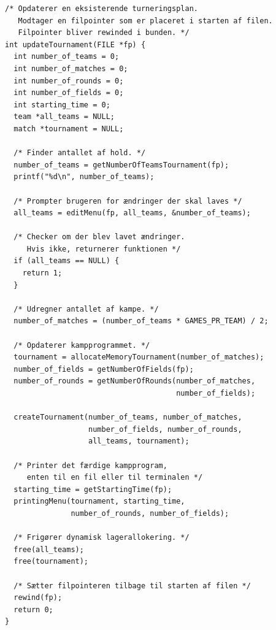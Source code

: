 \begin{listing}[H]
\begin{verbatim}
/* Opdaterer en eksisterende turneringsplan. 
   Modtager en filpointer som er placeret i starten af filen. 
   Filpointer bliver rewinded i bunden. */
int updateTournament(FILE *fp) {
  int number_of_teams = 0;
  int number_of_matches = 0;
  int number_of_rounds = 0;
  int number_of_fields = 0;
  int starting_time = 0;
  team *all_teams = NULL;
  match *tournament = NULL;

  /* Finder antallet af hold. */
  number_of_teams = getNumberOfTeamsTournament(fp);
  printf("%d\n", number_of_teams);

  /* Prompter brugeren for ændringer der skal laves */
  all_teams = editMenu(fp, all_teams, &number_of_teams);

  /* Checker om der blev lavet ændringer. 
     Hvis ikke, returnerer funktionen */
  if (all_teams == NULL) {
    return 1;
  }

  /* Udregner antallet af kampe. */
  number_of_matches = (number_of_teams * GAMES_PR_TEAM) / 2;

  /* Opdaterer kampprogrammet. */
  tournament = allocateMemoryTournament(number_of_matches);
  number_of_fields = getNumberOfFields(fp);
  number_of_rounds = getNumberOfRounds(number_of_matches, 
                                       number_of_fields);
                                       
  createTournament(number_of_teams, number_of_matches, 
                   number_of_fields, number_of_rounds, 
                   all_teams, tournament);

  /* Printer det færdige kampprogram, 
     enten til en fil eller til terminalen */
  starting_time = getStartingTime(fp);
  printingMenu(tournament, starting_time, 
               number_of_rounds, number_of_fields);

  /* Frigører dynamisk lagerallokering. */
  free(all_teams);
  free(tournament);

  /* Sætter filpointeren tilbage til starten af filen */
  rewind(fp);
  return 0;
}
\end{verbatim}
\label{code:updateTournament}
\end{listing}


